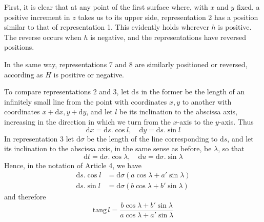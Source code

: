 First, it is clear that at any point of the first surface where, with \(x\) and \(y\) fixed, a positive increment in \(z\) takes us to its upper side, representation 2 has a position similar to that of representation 1. This evidently holds wherever \(h\) is positive. The reverse occurs when \(h\) is negative, and the representations have reversed positions.

In the same way, representations 7 and 8 are similarly positioned or reversed, according as \(H\) is positive or negative.

To compare representations 2 and 3, let \(\mathrm{d}s\) in the former be the length of an infinitely small line from the point with coordinates \(x,y\) to another with coordinates \(x+\mathrm{d}x,y+\mathrm{d}y\), and let \(l\) be its inclination to the abscissa axis, increasing in the direction in which we turn from the \(x\)-axis to the \(y\)-axis. Thus
\[
\mathrm{d}x=\mathrm{d}s\mathord{.}\cos l,\quad \mathrm{d}y=\mathrm{d}s\mathord{.}\sin l
\]
\noindent In representation 3 let \(\mathrm{d}\sigma\) be the length of the line corresponding to \(\mathrm{d}s\), and let its inclination to the abscissa axis, in the same sense as before, be \(\lambda\), so that
\[
\mathrm{d}t=\mathrm{d}\sigma\mathord{.}\cos\lambda,\quad \mathrm{d}u=\mathrm{d}\sigma\mathord{.}\sin\lambda
\]
\noindent Hence, in the notation of Article 4, we have
\[
\begin{aligned}
\mathrm{d}s\mathord{.}\cos l&=\mathrm{d}\sigma(a\cos\lambda+a'\sin\lambda)\\
\mathrm{d}s\mathord{.}\sin l&=\mathrm{d}\sigma(b\cos\lambda+b'\sin\lambda)
\end{aligned}
\]
\noindent and therefore
\[
\mathrm{tang}\,l=\frac{b\cos\lambda+b'\sin\lambda}{a\cos\lambda+a'\sin\lambda}
\]
